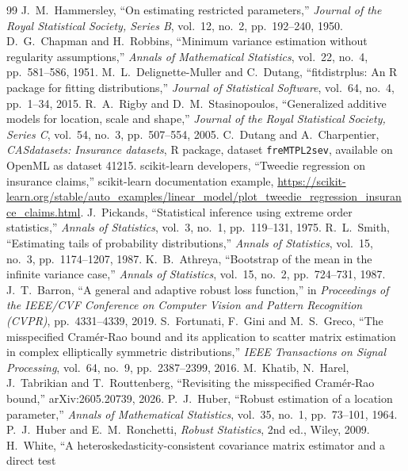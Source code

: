 \documentclass[11pt]{article}
\numberwithin{figure}{section}
\numberwithin{equation}{section}
\begin{document}
\begin{thebibliography}{99}
 J.~M.~Hammersley, ``On estimating restricted parameters,'' \emph{Journal of the
  Royal Statistical Society, Series B}, vol.~12, no.~2, pp.~192--240, 1950.
 D.~G.~Chapman and H.~Robbins, ``Minimum variance estimation without
  regularity assumptions,'' \emph{Annals of Mathematical Statistics}, vol.~22, no.~4,
  pp.~581--586, 1951.
 M.~L.~Delignette-Muller and C.~Dutang, ``fitdistrplus: An R package for
  fitting distributions,'' \emph{Journal of Statistical Software}, vol.~64, no.~4, pp.~1--34, 2015.
 R.~A.~Rigby and D.~M.~Stasinopoulos, ``Generalized additive models for location,
  scale and shape,'' \emph{Journal of the Royal Statistical Society, Series C}, vol.~54, no.~3,
  pp.~507--554, 2005.
 C.~Dutang and A.~Charpentier, \emph{CASdatasets: Insurance datasets}, R
  package, dataset \texttt{freMTPL2sev}, available on OpenML as dataset 41215.
 scikit-learn developers, ``Tweedie regression on insurance claims,''
  scikit-learn documentation example,
  \url{https://scikit-learn.org/stable/auto_examples/linear_model/plot_tweedie_regression_insurance_claims.html}.
 J.~Pickands, ``Statistical inference using extreme order statistics,''
  \emph{Annals of Statistics}, vol.~3, no.~1, pp.~119--131, 1975.
 R.~L.~Smith, ``Estimating tails of probability distributions,''
  \emph{Annals of Statistics}, vol.~15, no.~3, pp.~1174--1207, 1987.
 K.~B.~Athreya, ``Bootstrap of the mean in the infinite variance case,''
  \emph{Annals of Statistics}, vol.~15, no.~2, pp.~724--731, 1987.
 J.~T.~Barron, ``A general and adaptive robust loss function,'' in \emph{Proceedings of the IEEE/CVF Conference on Computer Vision and Pattern Recognition (CVPR)}, pp.~4331--4339, 2019.
 S.~Fortunati, F.~Gini and M.~S.~Greco, ``The misspecified Cram\'er-Rao bound and its
  application to scatter matrix estimation in complex elliptically symmetric distributions,''
  \emph{IEEE Transactions on Signal Processing}, vol.~64, no.~9, pp.~2387--2399, 2016.
 M.~Khatib, N.~Harel, J.~Tabrikian and T.~Routtenberg, ``Revisiting the misspecified
  Cram\'er-Rao bound,'' arXiv:2605.20739, 2026.
 P.~J.~Huber, ``Robust estimation of a location parameter,'' \emph{Annals of Mathematical
  Statistics}, vol.~35, no.~1, pp.~73--101, 1964.
 P.~J.~Huber and E.~M.~Ronchetti, \emph{Robust Statistics}, 2nd ed., Wiley, 2009.
 H.~White, ``A heteroskedasticity-consistent covariance matrix estimator and a direct test

\end{thebibliography}
\end{document}
